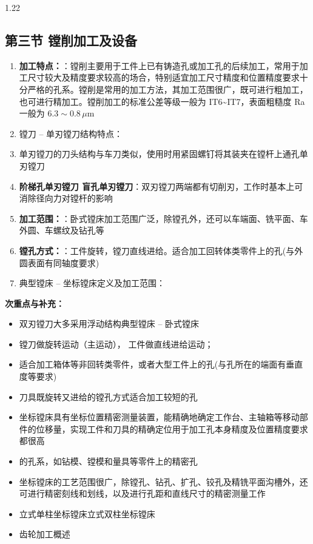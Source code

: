 \documentclass[12pt,a4paper]{article}
\begin{document}
\begin{spacing}{1.22}
\subsection{第三节 镗削加工及设备}
\begin{tcolorbox}[colback=yellow!6,colframe=red!55!black,title=重点,left=1mm,right=1mm]
\begin{enumerate}[leftmargin=2.2em,label=\arabic*.]
  \item \textbf{加工特点：}：镗削主要用于工件上已有铸造孔或加工孔的后续加工，常用于加工尺寸较大及精度要求较高的场合，特别适宜加工尺寸精度和位置精度要求十分严格的孔系。镗削是常用的加工方法，其加工范围很广，既可进行粗加工，也可进行精加工。镗削加工的标准公差等级一般为 IT6\textasciitilde{}IT7，表面粗糙度 Ra 一般为 $6.3\sim0.8\,\mu\text{m}$
  \item 镗刀 – 单刃镗刀结构特点：
  \item 单刃镗刀的刀头结构与车刀类似，使用时用紧固螺钉将其装夹在镗杆上通孔单刃镗刀
  \item \textbf{阶梯孔单刃镗刀 盲孔单刃镗刀}：双刃镗刀两端都有切削刃，工作时基本上可消除径向力对镗杆的影响
  \item \textbf{加工范围：}：卧式镗床加工范围广泛，除镗孔外，还可以车端面、铣平面、车外圆、车螺纹及钻孔等
  \item \textbf{镗孔方式：}：工件旋转，镗刀直线进给。适合加工回转体类零件上的孔(与外圆表面有同轴度要求)
  \item 典型镗床 – 坐标镗床定义及加工范围：
\end{enumerate}
\end{tcolorbox}
\noindent\textbf{次重点与补充：}
\begin{itemize}[leftmargin=2.2em,label=--]
  \item 双刃镗刀大多采用浮动结构典型镗床 – 卧式镗床
  \item 镗刀做旋转运动（主运动）， 工件做直线进给运动；
  \item 适合加工箱体等非回转类零件，或者大型工件上的孔(与孔所在的端面有垂直度等要求)
  \item 刀具既旋转又进给的镗孔方式适合加工较短的孔
  \item 坐标镗床具有坐标位置精密测量装置，能精确地确定工作台、主轴箱等移动部件的位移量，实现工件和刀具的精确定位用于加工孔本身精度及位置精度要求都很高
  \item 的孔系，如钻模、镗模和量具等零件上的精密孔
  \item 坐标镗床的工艺范围很广，除镗孔、钻孔、扩孔、铰孔及精铣平面沟槽外，还可进行精密刻线和划线，以及进行孔距和直线尺寸的精密测量工作
  \item 立式单柱坐标镗床立式双柱坐标镗床
  \item 齿轮加工概述
\end{itemize}


\end{spacing}
\end{document}

